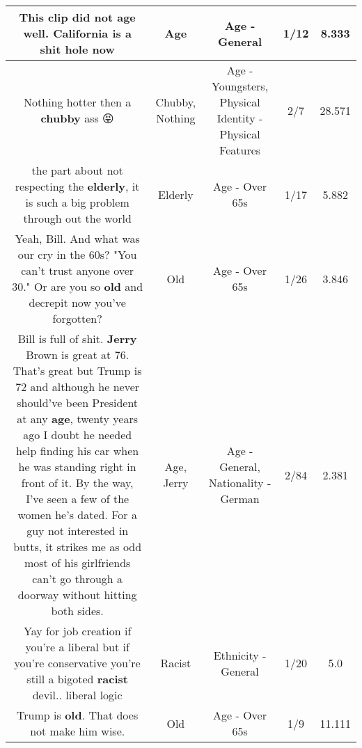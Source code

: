 \documentclass[11pt]{article}
\newlength\mylength
\begin{document}
\begin{center}
\begin{longtable}{|C{.65\mylength}|C{.30\mylength}|C{.12\mylength}|C{.12\mylength}|C{.12\mylength}|}
  \small This clip did not \textbf{age} well. California is a shit hole now\normalsize   & Age & Age - General & 1/12 & 8.333 \\  \hline
  \small Nothing hotter then a \textbf{chubby} ass 😝\normalsize   & Chubby, Nothing & Age - Youngsters, Physical Identity - Physical Features & 2/7 & 28.571 \\  \hline
  \small the part about not respecting the \textbf{elderly}, it is such a big problem through out the world\normalsize   & Elderly & Age - Over 65s & 1/17 & 5.882 \\  \hline
  \small Yeah, Bill. And what was our cry in the 60s? "You can't trust anyone over 30." Or are you so \textbf{old} and decrepit now you've forgotten?\normalsize   & Old & Age - Over 65s & 1/26 & 3.846 \\  \hline
  \small Bill is full of shit.  \textbf{Jerry} Brown is great at 76. That's great but Trump is 72 and although he never should've been President at any \textbf{age}, twenty years ago I doubt he  needed help finding his car when he was standing right in front of it. By the way, I've seen a few of the women he's dated. For a guy not interested in butts, it strikes me as odd most of his girlfriends can't go through a doorway without hitting both sides.\normalsize   & Age, Jerry & Age - General, Nationality - German & 2/84 & 2.381 \\  \hline
  \small Yay for job creation if you're a liberal but if you're conservative you're still a bigoted \textbf{racist} devil.. liberal logic\normalsize   & Racist & Ethnicity - General & 1/20 & 5.0 \\  \hline
  \small Trump is \textbf{old}. That does not make him wise.\normalsize   & Old & Age - Over 65s & 1/9 & 11.111 \\  \hline

\end{longtable}
\end{center}
\end{document}
